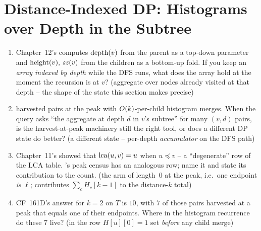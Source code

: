 \section{Distance-Indexed DP: Histograms over Depth in the Subtree}\label{sec:c10-distance}

\begin{previouslybox}
\begin{enumerate}[nosep, leftmargin=1.6em]
  \item Chapter~12's  computes $\operatorname{depth}(v)$ from the
        parent as a top-down parameter and $\operatorname{height}(v),\,\mathit{sz}(v)$
        from the children as a bottom-up fold. If you keep an
        \emph{array indexed by depth} while the DFS runs, what does the
        array hold at the moment the recursion is at $v$? (aggregate over
        nodes already visited at that depth -- the shape of the state
        this section makes precise)
  \item {} harvested pairs at the peak with
        $O(k)$-per-child histogram merges. When the query asks
        ``the aggregate at depth $d$ in $v$'s subtree'' for many
        $(v,d)$ pairs, is the harvest-at-peak machinery still the right
        tool, or does a different DP state do better? (a different state
        -- per-depth \emph{accumulator} on the DFS path)
  \item Chapter~11's  showed that
        $\operatorname{lca}(u,v)=u$ when $u \preceq v$ -- a ``degenerate'' row of the
        LCA table. 's peak census has an analogous
        row; name it and state its contribution to the count. (the arm
        of length~$0$ at the peak, i.e.\ one endpoint \emph{is} $\ell$;
        contributes $\sum_{c}H_{c}[k-1]$ to the distance-$k$ total)
  \item CF~161D's answer for $k=2$ on $T$ is $10$, with $7$ of those
        pairs harvested at a peak that equals one of their endpoints.
        Where in the histogram recurrence do these $7$ live? (in the
        row $\mathit{H}[u][0]=1$ set \emph{before} any child merge)
\end{enumerate}
\end{previouslybox}


